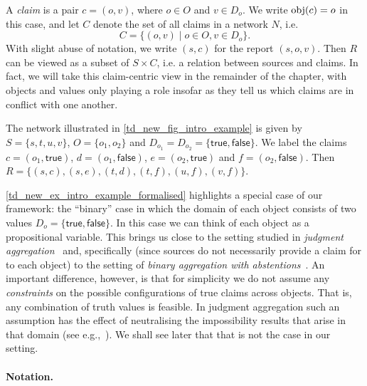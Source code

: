 A \emph{claim} is a pair $c = (o, v)$, where $o \in O$ and $v \in D_o$. We
write $\operatorname{obj}(c) = o$ in this case, and let $C$ denote the set of all claims in a
network $N$, i.e.
\[
    C = \{(o, v) \mid o \in O, v \in D_o\}.
\]
With slight abuse of notation, we write $(s, c)$ for the report $(s, o, v)$.
Then $R$ can be viewed as a subset of $S \times C$, i.e. a relation between
sources and claims. In fact, we will take this claim-centric view in the
remainder of the chapter, with objects and values only playing a role insofar as
they tell us which claims are in conflict with one another.

\begin{example}
    \label{td_new_ex_intro_example_formalised}
    The network illustrated in \cref{td_new_fig_intro_example} is given by $S =
    \{s, t, u, v\}$, $O = \{o_1, o_2\}$ and $D_{o_1} = D_{o_2} =
    \{\mathsf{true}, \mathsf{false}\}$. We label the claims $c = (o_1,
    \mathsf{true})$, $d = (o_1, \mathsf{false})$, $e = (o_2, \mathsf{true})$
    and $f = (o_2, \mathsf{false})$. Then
    $
        R = \{
            (s, c), (s, e),
            (t, d), (t, f),
            (u, f),
            (v, f)
        \}
    $.
\end{example}

\cref{td_new_ex_intro_example_formalised} highlights a special case of our
framework: the ``binary'' case in which the domain of each object consists of
two values $D_o = \{\mathsf{true}, \mathsf{false}\}$.  In this case we can
think of each object as a propositional variable. This brings us close to the
setting studied in \emph{judgment aggregation}~\cite{endriss2016ja} and,
specifically (since sources do not necessarily provide a claim for to each
object) to the setting of \emph{binary aggregation with
abstentions}~\cite{christoffbinary,dokow}. An important difference, however, is
that for simplicity we do not assume any \emph{constraints} on the possible
configurations of true claims across objects. That is, any combination of truth
values is feasible. In judgment aggregation such an assumption has the effect
of neutralising the impossibility results that arise in that domain (see
e.g.,~\cite{christoffbinary}). We shall see later that that is not the case in
our setting.

\paragraph{Notation.}

